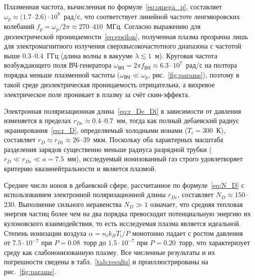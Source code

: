 \documentclass[reprint, amsmath, amssymb, aps, pra, nofootinbib]{revtex4-2}
\begin{document}
Плазменная частота, вычисленная по формуле~\eqref{eq:omega_p}, составляет $\omega_p \approx (1.7$--$2.6)\cdot10^9$~рад/с, что соответствует линейной частоте ленгмюровских колебаний $f_p = \omega_p/2\pi \approx 270$--$410$~МГц. Согласно выражению для диэлектрической проницаемости~\eqref{eq:epsilon}, полученная плазма прозрачна лишь для электромагнитного излучения сверхвысокочастотного диапазона с частотой выше $0.3$--$0.4$~ГГц (длина волны в вакууме $\lambda \lesssim 1$~м). Круговая частота возбуждающего поля ВЧ-генератора $\omega_{\text{ВЧ}} = 2\pi f_{\text{ВЧ}} \approx 6.3\cdot10^7$~рад/с на полтора порядка меньше плазменной частоты ($\omega_{\text{ВЧ}} \ll \omega_p$, рис.~\ref{fig:params}), поэтому в такой среде диэлектрическая проницаемость отрицательна, а вихревое электрическое поле проникает в плазму за счёт скин-эффекта.

Электронная поляризационная длина~\eqref{eq:r_De_Di} в зависимости от давления изменяется в пределах $r_{De} \approx 0.4$--$0.7$~мм, тогда как полный дебаевский радиус экранирования~\eqref{eq:r_D}, определяемый холодными ионами ($T_i = 300$~К), составляет $r_D \approx r_{Di} \approx 26$--$39$~мкм. Поскольку оба характерных масштаба разделения зарядов существенно меньше радиуса разрядной трубки ($r_D \ll r_{De} \ll a = 7.5$~мм), исследуемый ионизованный газ строго удовлетворяет критерию квазинейтральности и является плазмой.

Среднее число ионов в дебаевской сфере, рассчитанное по формуле~\eqref{eq:N_D} с использованием электронной поляризационной длины $r_{De}$, составляет $N_D \approx 150$--$230$. Выполнение сильного неравенства $N_D \gg 1$ означает, что средняя тепловая энергия частиц более чем на два порядка превосходит потенциальную энергию их кулоновского взаимодействия, то есть исследуемая плазма является идеальной. Степень ионизации воздуха $\alpha = n_i k_B T_i / P$ монотонно падает с ростом давления от $7.5\cdot10^{-7}$ при $P = 0.08$~торр до $1.5\cdot10^{-7}$ при $P = 0.20$~торр, что характеризует среду как слабоионизованную плазму. Все численные результаты и их погрешности сведены в табл.~\ref{tab:results} и проиллюстрированы на рис.~\ref{fig:params}.
\end{document}
